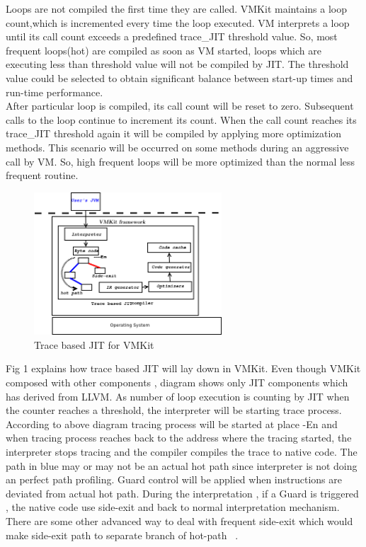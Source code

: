 \label{sec:architecture}
Loops are not compiled the first time they are called. VMKit maintains a loop count,which is incremented every time the loop executed.  VM interprets a loop until its call count exceeds a predefined trace\_JIT threshold value. So, most frequent loops(hot) are compiled as soon as VM started, loops which are executing less than threshold value will not be compiled by JIT. The threshold value could be selected to obtain significant balance between start-up times and run-time performance.\\
After particular loop is compiled, its call count will be reset to zero. Subsequent calls to the loop continue to increment its count. When the call count reaches its trace\_JIT threshold again it will be compiled by applying more optimization methods. This scenario will be occurred on some methods during an aggressive call by VM. So, high frequent loops will be more optimized than the normal less frequent routine.

\begin{figure}[ht!]
\centering
\includegraphics[width=70mm]{compiler.png}
\caption{Trace based JIT for VMKit}
\label{fig:architecture}
\end{figure}

Fig 1 explains how trace based JIT will lay down in VMKit. Even though VMKit composed with other components , diagram shows only JIT components which has derived from LLVM. As number of loop execution is counting by JIT when the counter reaches a threshold, the interpreter will be starting trace process. According to above diagram tracing process will be started at place -En and when tracing process reaches  back to the address where the tracing started, the interpreter stops tracing and the compiler compiles the trace to native code. The path in blue may or may not be an actual hot path since interpreter is not doing an perfect path profiling. Guard control will be applied when instructions are deviated from actual hot path. During the interpretation , if a Guard is triggered , the native code use side-exit and back to normal interpretation mechanism. There are some other advanced way to deal with frequent side-exit which would make side-exit path to separate branch of hot-path ~\cite{arch2}.

